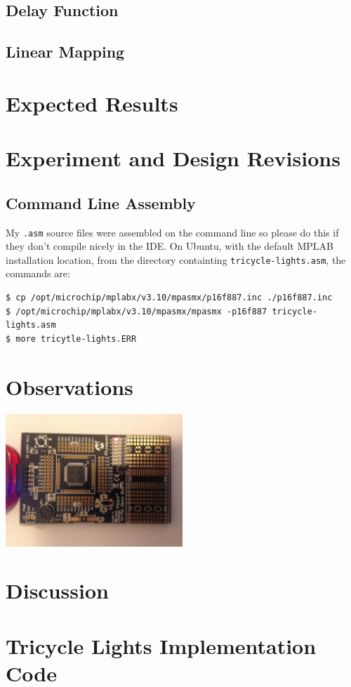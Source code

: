 \documentclass[11pt]{article}
\begin{document}
\subsection{Delay Function}

\subsection{Linear Mapping}

\section{Expected Results}

\section{Experiment and Design Revisions}

\subsection{Command Line Assembly}

My \texttt{.asm} source files were assembled on the command line so
please do this if they don't compile nicely in the IDE.
On Ubuntu, with the default MPLAB installation location, 
from the directory containting \texttt{tricycle-lights.asm}, the commands are:
\begin{verbatim}
$ cp /opt/microchip/mplabx/v3.10/mpasmx/p16f887.inc ./p16f887.inc
$ /opt/microchip/mplabx/v3.10/mpasmx/mpasmx -p16f887 tricycle-lights.asm
$ more tricytle-lights.ERR
\end{verbatim}

\section{Observations}

\begin{center}
	\includegraphics[width=0.5\textwidth]{Figures/demo.jpeg}
	\label{tricycle-lights-jpg}
\end{center}

\section{Discussion}

\clearpage

\section{Tricycle Lights Implementation Code}
\label{implementation-code}


\end{document}
